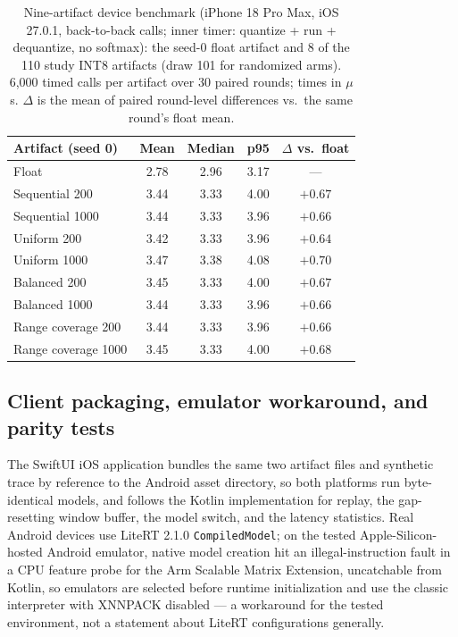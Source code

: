 \documentclass[10pt,twocolumn]{article}
\begin{document}
\begin{table}[!tp]
\centering
\caption{Nine-artifact device benchmark (iPhone 18 Pro Max, iOS 27.0.1,
back-to-back calls; inner timer: quantize + run + dequantize, no
softmax): the seed-0 float artifact and 8 of the 110 study INT8 artifacts
(draw 101 for randomized arms). 6{,}000 timed calls per artifact over 30
paired rounds; times in $\mu$s. $\Delta$ is the mean of paired round-level
differences vs.\ the same round's float mean.}
\label{tab:devicebench}
\footnotesize
\begin{tabular}{@{}lcccc@{}}
\toprule
Artifact (seed 0) & Mean & Median & p95 & $\Delta$ vs.\ float \\
\midrule
Float & 2.78 & 2.96 & 3.17 & --- \\
Sequential 200 & 3.44 & 3.33 & 4.00 & $+0.67$ \\
Sequential 1000 & 3.44 & 3.33 & 3.96 & $+0.66$ \\
Uniform 200 & 3.42 & 3.33 & 3.96 & $+0.64$ \\
Uniform 1000 & 3.47 & 3.38 & 4.08 & $+0.70$ \\
Balanced 200 & 3.45 & 3.33 & 4.00 & $+0.67$ \\
Balanced 1000 & 3.44 & 3.33 & 3.96 & $+0.66$ \\
Range coverage 200 & 3.44 & 3.33 & 3.96 & $+0.66$ \\
Range coverage 1000 & 3.45 & 3.33 & 4.00 & $+0.68$ \\
\bottomrule
\end{tabular}
\end{table}

\subsection{Client packaging, emulator workaround, and parity tests}

The SwiftUI iOS application bundles the same two artifact files and
synthetic trace by reference to the Android asset directory, so both
platforms run byte-identical models, and follows the Kotlin implementation
for replay, the gap-resetting window buffer, the model switch, and the
latency statistics. Real Android devices use LiteRT 2.1.0
\texttt{CompiledModel}; on the tested Apple-Silicon-hosted Android
emulator, native model creation
hit an illegal-instruction fault in a CPU feature probe for the Arm
Scalable Matrix Extension, uncatchable from Kotlin, so emulators are
selected before runtime initialization and use the classic interpreter
with XNNPACK disabled --- a workaround for the tested environment, not a
statement about LiteRT configurations generally.
\end{document}
